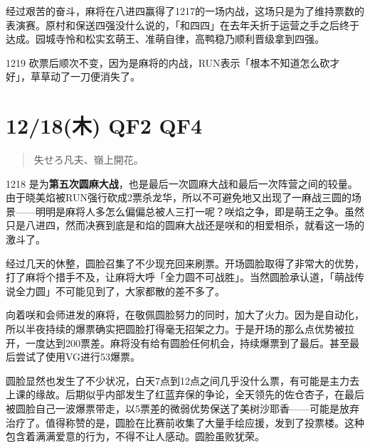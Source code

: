 经过艰苦的奋斗，麻将在八进四赢得了1217的一场内战，这场只是为了维持票数的表演赛。原村和保送四强没什么说的，「和四四」在去年夭折于运营之手之后终于达成。园城寺怜和松实玄萌王、准萌自律，高鸭稳乃顺利晋级拿到四强。

1219 砍票后顺次不变，因为是麻将的内战，RUN表示「根本不知道怎么砍才好」，草草动了一刀便消失了。

\section{12/18(木) QF2 QF4}

\begin{quote}\kasho
失せろ凡夫、嶺上開花。
\end{quote}



1218 是为\textbf{第五次圆麻大战}，也是最后一次圆麻大战和最后一次阵营之间的较量。由于晓美焰被RUN强行砍成2票杀龙华，所以不可避免地又出现了一麻战三圆的场景——明明是麻将人多怎么偏偏总被人三打一呢？咲焰之争，即是萌王之争。虽然只是八进四，然而决赛到底是和焰的圆麻大战还是咲和的相爱相杀，就看这一场的激斗了。

经过几天的休整，圆脸召集了不少现充回来刷票。开场圆脸取得了非常大的优势，打了麻将个措手不及，让麻将大呼「全力圆不可战胜」。当然圆脸承认道，「萌战传说全力圆」不可能见到了，大家都散的差不多了。

向着咲和会师进发的麻将，在敬佩圆脸努力的同时，加大了火力。因为是自动化，所以半夜持续的爆票确实把圆脸打得毫无招架之力。于是开场的那么点优势被拉开，一度达到200票差。麻将没有给有圆脸任何机会，持续爆票到了最后。甚至最后尝试了使用VG进行53爆票。

圆脸显然也发生了不少状况，白天7点到12点之间几乎没什么票，有可能是主力去上课的缘故。后期似乎内部发生了红蓝弃保的争论，全天领先的佐仓杏子，在最后被圆脸自己一波爆票带走，以5票差的微弱优势保送了美树沙耶香——可能是放弃治疗了。值得称赞的是，圆脸在比赛前收集了大量手绘应援，发到了投票楼。这种包含着满满爱意的行为，不得不让人感动。圆脸虽败犹荣。

